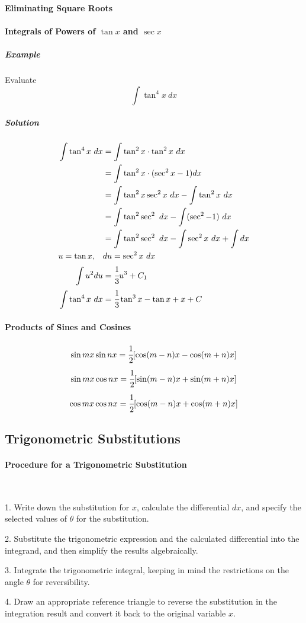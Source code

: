 \documentclass{article}
\begin{document}
            \paragraph{Eliminating Square Roots}
            \paragraph{Integrals of Powers of $\tan x$ and $\sec x$}
                \subparagraph{Example} Evaluate 
                \[\int \tan^4 x\ dx\]
                \subparagraph{Solution}
                \begin{equation}
                    \begin{aligned}
                        \int \tan^4x\ dx&=\int \tan^2x\cdot\tan ^2 x\ dx\\
                        &=\int \tan^2x\cdot(\sec ^2x-1) dx\\
                        &=\int \tan^2x\sec^2x\ dx-\int\tan^2x\ dx\\
                        &=\int\tan^2\sec^2\ dx-\int(\sec^2-1)\ dx\\
                        &=\int\tan^2\sec^2\ dx-\int\sec^2x\ dx+\int dx\\
                        u=\tan x,\quad &du=\sec^2x\ dx\\
                        \int u^2du&=\cfrac{1}{3}u^3+C_1\\ 
                        \int \tan^4x\ dx&=\cfrac{1}{3}\tan^3x-\tan x+x+C\\
                    \end{aligned}
                \end{equation}
            \paragraph{Products of Sines and Cosines}
            \[\sin mx\sin nx=\cfrac{1}{2}[\cos(m-n)x-\cos(m+n)x]\]
            \[\sin mx\cos nx=\cfrac{1}{2}[\sin(m-n)x+\sin(m+n)x]\]
            \[\cos mx\cos nx=\cfrac{1}{2}[\cos(m-n)x+\cos(m+n)x]\]
        \subsection{Trigonometric Substitutions}
            \paragraph{Procedure for a Trigonometric Substitution}
            \text{}\\
            \par 1. Write down the substitution for $x$, calculate the differential $dx$, and specify the selected values of $\theta$ for the substitution.
            \par 2. Substitute the trigonometric expression and the calculated differential into the integrand, and then simplify the results algebraically.
            \par 3. Integrate the trigonometric integral, keeping in mind the restrictions on the angle $\theta$ for reversibility.
            \par 4. Draw an appropriate reference triangle to reverse the substitution in the integration result and convert it back to the original variable $x$.
\end{document}
